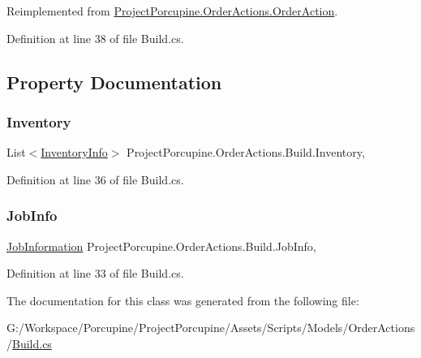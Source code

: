 Reimplemented from \hyperlink{class_project_porcupine_1_1_order_actions_1_1_order_action_afb48593caf6e46d965ac5182bcfe1c4b}{Project\+Porcupine.\+Order\+Actions.\+Order\+Action}.



Definition at line 38 of file Build.\+cs.



\subsection{Property Documentation}
\mbox{\label{class_project_porcupine_1_1_order_actions_1_1_build_a17979152c918c31ce1342de97e253b86}} 
\subsubsection{\texorpdfstring{Inventory}{Inventory}}
{\footnotesize\ttfamily List$<$\hyperlink{class_project_porcupine_1_1_order_actions_1_1_order_action_1_1_inventory_info}{Inventory\+Info}$>$ Project\+Porcupine.\+Order\+Actions.\+Build.\+Inventory\hspace{0.3cm}{\ttfamily [get]}, {\ttfamily [set]}}



Definition at line 36 of file Build.\+cs.

\mbox{\label{class_project_porcupine_1_1_order_actions_1_1_build_a9f7cbc7ac9061a9651e7f1dbfed37490}} 
\subsubsection{\texorpdfstring{Job\+Info}{JobInfo}}
{\footnotesize\ttfamily \hyperlink{class_project_porcupine_1_1_order_actions_1_1_order_action_1_1_job_information}{Job\+Information} Project\+Porcupine.\+Order\+Actions.\+Build.\+Job\+Info\hspace{0.3cm}{\ttfamily [get]}, {\ttfamily [set]}}



Definition at line 33 of file Build.\+cs.



The documentation for this class was generated from the following file\+:\begin{DoxyCompactItemize}
\item 
G\+:/\+Workspace/\+Porcupine/\+Project\+Porcupine/\+Assets/\+Scripts/\+Models/\+Order\+Actions/\hyperlink{_build_8cs}{Build.\+cs}\end{DoxyCompactItemize}
